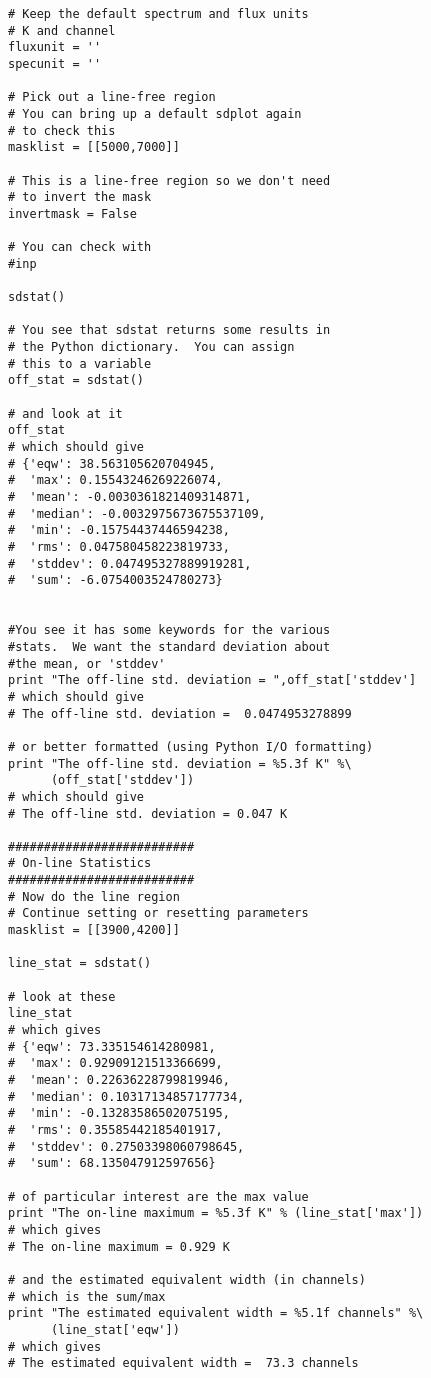 \begin{verbatim}
# Keep the default spectrum and flux units
# K and channel
fluxunit = ''
specunit = ''

# Pick out a line-free region
# You can bring up a default sdplot again
# to check this
masklist = [[5000,7000]]

# This is a line-free region so we don't need
# to invert the mask
invertmask = False

# You can check with
#inp

sdstat()

# You see that sdstat returns some results in
# the Python dictionary.  You can assign
# this to a variable
off_stat = sdstat()

# and look at it
off_stat
# which should give
# {'eqw': 38.563105620704945,
#  'max': 0.15543246269226074,
#  'mean': -0.0030361821409314871,
#  'median': -0.0032975673675537109,
#  'min': -0.15754437446594238,
#  'rms': 0.047580458223819733,
#  'stddev': 0.047495327889919281,
#  'sum': -6.0754003524780273}


#You see it has some keywords for the various
#stats.  We want the standard deviation about
#the mean, or 'stddev'
print "The off-line std. deviation = ",off_stat['stddev']
# which should give
# The off-line std. deviation =  0.0474953278899

# or better formatted (using Python I/O formatting)
print "The off-line std. deviation = %5.3f K" %\
      (off_stat['stddev'])
# which should give
# The off-line std. deviation = 0.047 K

##########################
# On-line Statistics
##########################
# Now do the line region
# Continue setting or resetting parameters
masklist = [[3900,4200]]

line_stat = sdstat()

# look at these
line_stat
# which gives
# {'eqw': 73.335154614280981,
#  'max': 0.92909121513366699,
#  'mean': 0.22636228799819946,
#  'median': 0.10317134857177734,
#  'min': -0.13283586502075195,
#  'rms': 0.35585442185401917,
#  'stddev': 0.27503398060798645,
#  'sum': 68.135047912597656}

# of particular interest are the max value
print "The on-line maximum = %5.3f K" % (line_stat['max'])
# which gives
# The on-line maximum = 0.929 K

# and the estimated equivalent width (in channels)
# which is the sum/max
print "The estimated equivalent width = %5.1f channels" %\
      (line_stat['eqw'])
# which gives
# The estimated equivalent width =  73.3 channels


\end{verbatim}
